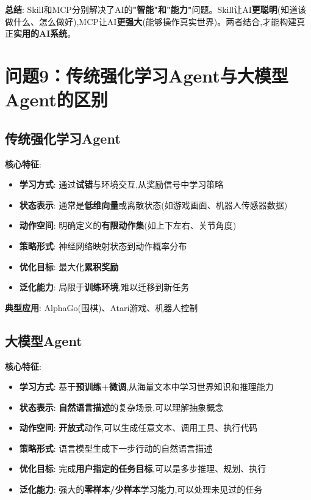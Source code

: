 \documentclass[UTF8]{ctexart}
\begin{document}
\textbf{总结}: Skill和MCP分别解决了AI的\textbf{"智能"和"能力"}问题。Skill让AI\textbf{更聪明}(知道该做什么、怎么做好),MCP让AI\textbf{更强大}(能够操作真实世界)。两者结合,才能构建真正\textbf{实用的AI系统}。

\section{问题9：传统强化学习Agent与大模型Agent的区别}

\subsection{传统强化学习Agent}

\textbf{核心特征}:
\begin{itemize}
    \item \textbf{学习方式}: 通过\textbf{试错}与环境交互,从奖励信号中学习策略
    \item \textbf{状态表示}: 通常是\textbf{低维向量}或离散状态(如游戏画面、机器人传感器数据)
    \item \textbf{动作空间}: 明确定义的\textbf{有限动作集}(如上下左右、关节角度)
    \item \textbf{策略形式}: 神经网络映射状态到动作概率分布
    \item \textbf{优化目标}: 最大化\textbf{累积奖励}
    \item \textbf{泛化能力}: 局限于\textbf{训练环境},难以迁移到新任务
\end{itemize}

\textbf{典型应用}: AlphaGo(围棋)、Atari游戏、机器人控制

\subsection{大模型Agent}

\textbf{核心特征}:
\begin{itemize}
    \item \textbf{学习方式}: 基于\textbf{预训练+微调},从海量文本中学习世界知识和推理能力
    \item \textbf{状态表示}: \textbf{自然语言描述}的复杂场景,可以理解抽象概念
    \item \textbf{动作空间}: \textbf{开放式}动作,可以生成任意文本、调用工具、执行代码
    \item \textbf{策略形式}: 语言模型生成下一步行动的自然语言描述
    \item \textbf{优化目标}: 完成\textbf{用户指定的任务目标},可以是多步推理、规划、执行
    \item \textbf{泛化能力}: 强大的\textbf{零样本/少样本}学习能力,可以处理未见过的任务
\end{itemize}
\end{document}
